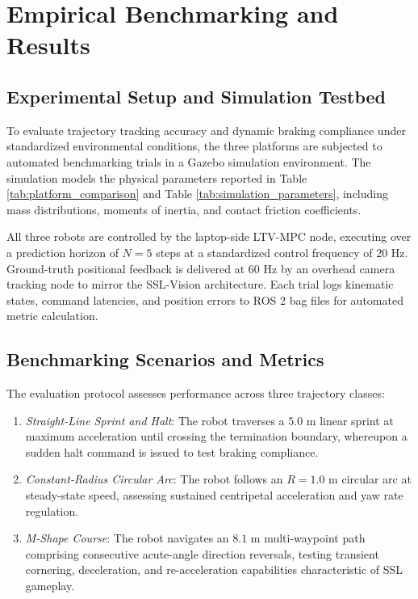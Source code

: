 \documentclass[a4paper,twoside,12pt]{report}
\begin{document}
\chapter{Empirical Benchmarking and Results}\label{chapter: results}

\section{Experimental Setup and Simulation Testbed}

To evaluate trajectory tracking accuracy and dynamic braking compliance under standardized environmental conditions, the three platforms are subjected to automated benchmarking trials in a Gazebo simulation environment. The simulation models the physical parameters reported in Table \ref{tab:platform_comparison} and Table \ref{tab:simulation_parameters}, including mass distributions, moments of inertia, and contact friction coefficients. 

All three robots are controlled by the laptop-side LTV-MPC node, executing over a prediction horizon of $N=5$ steps at a standardized control frequency of $20\text{ Hz}$. Ground-truth positional feedback is delivered at $60\text{ Hz}$ by an overhead camera tracking node to mirror the SSL-Vision architecture. Each trial logs kinematic states, command latencies, and position errors to ROS 2 bag files for automated metric calculation.

\section{Benchmarking Scenarios and Metrics}

The evaluation protocol assesses performance across three trajectory classes:
\begin{enumerate}
\item \textit{Straight-Line Sprint and Halt}: The robot traverses a $5.0\text{ m}$ linear sprint at maximum acceleration until crossing the termination boundary, whereupon a sudden halt command is issued to test braking compliance.
\item \textit{Constant-Radius Circular Arc}: The robot follows an $R = 1.0\text{ m}$ circular arc at steady-state speed, assessing sustained centripetal acceleration and yaw rate regulation.
\item \textit{M-Shape Course}: The robot navigates an $8.1\text{ m}$ multi-waypoint path comprising consecutive acute-angle direction reversals, testing transient cornering, deceleration, and re-acceleration capabilities characteristic of SSL gameplay.
\end{enumerate}
\end{document}
